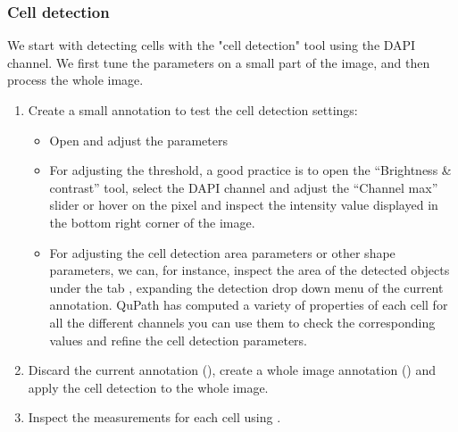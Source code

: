 \documentclass[a4paper,DIV=17,dvipsnames,headsepline]{scrartcl}
\begin{document}
 \subsubsection{Cell detection} \label{sss:cell-detection}
 We start with detecting cells with the "cell detection" tool using the DAPI channel. We first tune the parameters on a small part of the image, and then process the whole image. 
\begin{enumerate}
    \item Create a small annotation to test the cell detection settings:
    \begin{itemize}
        \item Open  and adjust the parameters 
        \item For adjusting the threshold, a good practice is to open the ``Brightness \& contrast'' tool, select the DAPI channel and adjust the ``Channel max'' slider or hover on the pixel and inspect the intensity value displayed in the bottom right corner of the image.
        \item For adjusting the cell detection area parameters or other shape parameters, we can, for instance, inspect the area of the detected objects under the tab , expanding the detection drop down menu of the current annotation. QuPath has computed a variety of properties of each cell for all the different channels you can use them to check the corresponding values and refine the cell detection parameters.
    \end{itemize}      
    \item Discard the current annotation (), create a whole image annotation () and apply the cell detection to the whole image.
    \item Inspect the measurements for each cell using  .
    

\end{enumerate}
\end{document}
